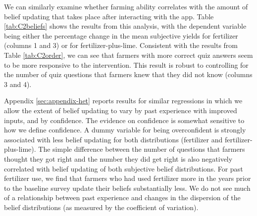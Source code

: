 \documentclass[12pt,letterpaper]{article}
\begin{document}



% 

% 


We can similarly examine whether farming ability correlates with the amount of belief updating that takes place after interacting with the app. Table \ref{tab:C2beliefs} shows the results from this analysis, with the dependent variable being either the percentage change in the mean subjective yields for fertilizer (columns 1 and 3) or for fertilizer-plus-lime. Consistent with the results from Table \ref{tab:C2order}, we can see that farmers with more correct quiz answers seem to be more responsive to the intervention. This result is robust to controlling for the number of quiz questions that farmers knew that they did not know (columns 3 and 4).

Appendix \ref{sec:appendix-het} reports results for similar regressions in which we allow the extent of belief updating to vary by past experience with improved inputs, and by confidence. The evidence on confidence is somewhat sensitive to how we define confidence. A dummy variable for being overconfident is strongly associated with less belief updating for both distributions (fertilizer and fertilizer-plus-lime). The simple difference between the number of questions that farmers thought they got right and the number they did get right is also negatively correlated with belief updating of both subjective belief distributions. For past fertilizer use, we find that farmers who had used fertilizer more in the years prior to the baseline survey update their beliefs substantially less. We do not see much of a relationship between past experience and changes in the dispersion of the belief distributions (as measured by the coefficient of variation).





\end{document}
